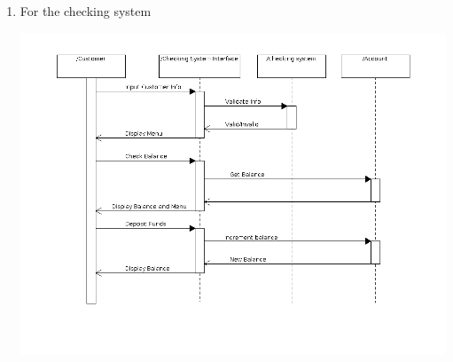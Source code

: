 \documentclass[12pt,letterpaper]{article}
\begin{document}
\begin{enumerate}
    \item For the checking system

      \includegraphics[width=\textwidth]{hw1_part2_4.png}
  \end{enumerate}
\end{document}
